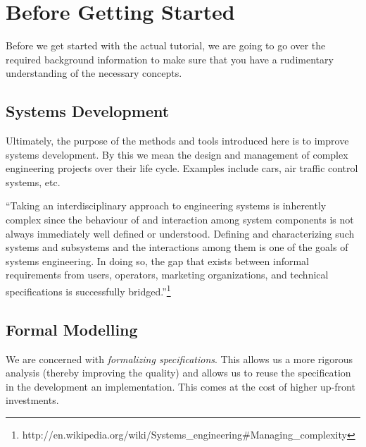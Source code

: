 \section{Before Getting Started}
\label{tut_before_getting_started}

Before we get started with the actual tutorial, we are going to go over the required background information to make sure that you have a rudimentary understanding of the necessary concepts.


\subsection{Systems Development}
\label{tut_systems_development}

Ultimately, the purpose of the methods and tools introduced here is to improve systems development.  By this we mean the design and management of complex engineering projects over their life cycle.  Examples include cars, air traffic control systems, etc.

``Taking an interdisciplinary approach to engineering systems is inherently complex since the behaviour of and interaction among system components is not always immediately well defined or understood. Defining and characterizing such systems and subsystems and the interactions among them is one of the goals of systems engineering. In doing so, the gap that exists between informal requirements from users, operators, marketing organizations, and technical specifications is successfully bridged.''\footnote{http://en.wikipedia.org/wiki/Systems_engineering#Managing_complexity}

\subsection{Formal Modelling}
\label{tut_formal_modelling}

We are concerned with \textit{formalizing specifications}.  This allows us a more rigorous analysis (thereby improving the quality) and allows us to reuse the specification in the development an implementation.  This comes at the cost of higher up-front investments.

